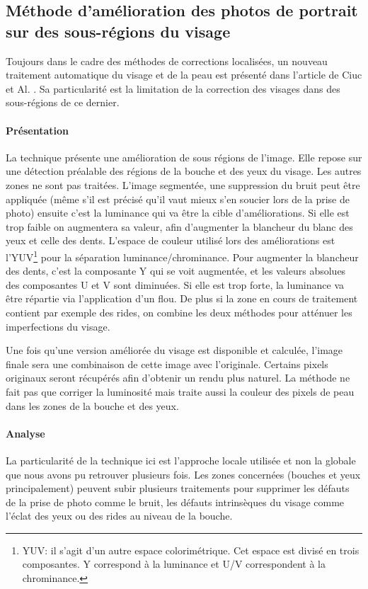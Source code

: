 \documentclass[11pt, french]{report-rd-info}
\begin{document}
\subsection{Méthode d’amélioration des photos de portrait sur des sous-régions du visage}
Toujours dans le cadre des méthodes de corrections localisées, un nouveau traitement automatique du visage et de la peau est présenté dans l’article de Ciuc et Al. \cite{Ciuc2010}. Sa particularité est la limitation de la correction des visages dans des sous-régions de ce dernier.
\paragraph{Présentation}
La technique présente une amélioration de sous régions de l’image.  Elle repose sur une détection préalable des régions de la bouche et des yeux du visage. Les autres zones ne sont pas traitées.
L’image segmentée, une suppression du bruit peut être appliquée (même s’il est précisé qu’il vaut mieux s’en soucier lors de la prise de photo) ensuite c’est la luminance qui va être la cible d’améliorations. Si elle est trop faible on augmentera sa valeur, afin d’augmenter la blancheur du blanc des yeux et celle des dents. L’espace de couleur utilisé lors des améliorations est l’YUV\footnote{YUV: il s'agit d'un autre espace colorimétrique. Cet espace est divisé en trois composantes. Y correspond à la luminance et U/V correspondent à la chrominance.} pour la séparation luminance/chrominance. Pour augmenter la blancheur des dents, c’est la composante Y qui se voit augmentée, et les valeurs absolues des composantes U et V sont diminuées.
Si elle est trop forte, la luminance va être répartie via l’application d’un flou. De plus si la zone en cours de traitement contient par exemple des rides, on combine les deux méthodes pour atténuer les imperfections du visage.

Une fois qu’une version améliorée du visage est disponible et calculée, l’image finale sera une combinaison de cette image avec l’originale. Certains pixels originaux seront récupérés afin d’obtenir un rendu plus naturel.
La méthode ne fait pas que corriger la luminosité mais traite aussi la couleur des pixels de peau dans les zones de la bouche et des yeux.
\paragraph{Analyse}
La particularité de la technique ici est l’approche locale utilisée et non la globale que nous avons pu retrouver plusieurs fois. Les zones concernées (bouches et yeux principalement) peuvent subir plusieurs traitements pour supprimer les défauts de la prise de photo comme le bruit, les défauts intrinsèques du visage comme l’éclat des yeux ou des rides au niveau de la bouche.
\end{document}
